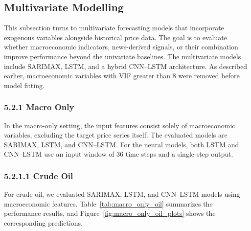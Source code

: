 \documentclass[pdflatex,sn-mathphys-num]{sn-jnl}%
\theoremstyle{thmstyleone}%
\theoremstyle{thmstyletwo}%
\theoremstyle{thmstylethree}%
\begin{document}
\subsection{Multivariate Modelling}\label{subsec:multivariate_models}

This subsection turns to multivariate forecasting models that incorporate exogenous variables alongside historical price data. The goal is to evaluate whether macroeconomic indicators, news-derived signals, or their combination improve performance beyond the univariate baselines. The multivariate models include SARIMAX, LSTM, and a hybrid CNN--LSTM architecture. As described earlier, macroeconomic variables with VIF greater than 8 were removed before model fitting.

\subsubsection*{5.2.1 Macro Only}

In the macro-only setting, the input features consist solely of macroeconomic variables, excluding the target price series itself. The evaluated models are SARIMAX, LSTM, and CNN--LSTM. For the neural models, both LSTM and CNN--LSTM use an input window of 36 time steps and a single-step output.

\subsubsection*{5.2.1.1 Crude Oil}
For crude oil, we evaluated SARIMAX, LSTM, and CNN--LSTM models using macroeconomic features. Table~\ref{tab:macro_only_oil} summarizes the performance results, and Figure~\ref{fig:macro_only_oil_plots} shows the corresponding predictions.
\end{document}
